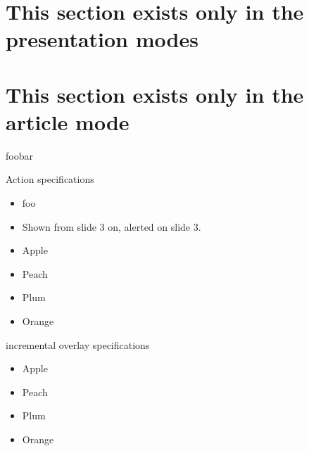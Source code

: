 \documentclass{beamer}
\begin{document}
\begin{frame}
\end{frame}

\begin{frame}
\end{frame}

\section<presentation>{This section exists only in the presentation modes}
\section<article>{This section exists only in the article mode}
\begin{frame}
foobar
\end{frame}

%

\begin{frame}{Action specifications}
\begin{itemize}
\item foo
\item<3-| alert@3> Shown from slide 3 on, alerted on slide 3.
\end{itemize}
\end{frame}

%


\begin{frame}
\begin{itemize}
\item<1-> Apple
\item<2-> Peach
\item<3-> Plum
\item<4-> Orange
\end{itemize}
\end{frame}

\begin{frame}{incremental overlay specifications}
\begin{itemize}
\item<+-> Apple
\item<+-> Peach
\item<+-> Plum
\item<+-> Orange
\end{itemize}
\end{frame}
\end{document}
